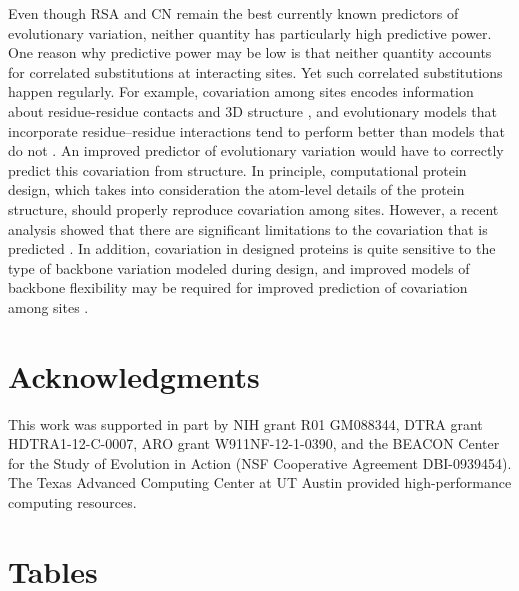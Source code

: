 \documentclass[smallextended]{svjour3}
\begin{document}
Even though RSA and CN remain the best currently known predictors of evolutionary variation, neither quantity has particularly high predictive power. One reason why predictive power may be low is that neither quantity accounts for correlated substitutions at interacting sites.  Yet such correlated substitutions happen regularly. For example, covariation among sites encodes information about residue-residue contacts and 3D structure \citep{Halabietal2009,BurgervanNimwegen2010,Marksetal2011,Jonesetal2014}, and evolutionary models that incorporate residue--residue interactions tend to perform better than models that do not \citep{Rodrigueetal2005,BordnerMittelmann2014}. An improved predictor of evolutionary variation would have to correctly predict this covariation from structure. In principle, computational protein design, which takes into consideration the atom-level details of the protein structure, should properly reproduce covariation among sites. However, a recent analysis showed that there are significant limitations to the covariation that is predicted \citep{OllikainenKortemme2013}. In addition, covariation in designed proteins is quite sensitive to the type of backbone variation modeled during design, and improved models of backbone flexibility may be required for improved prediction of covariation among sites \citep{OllikainenKortemme2013}.

\section*{Acknowledgments}

This work was supported in part by NIH grant R01 GM088344, DTRA grant HDTRA1-12-C-0007, ARO grant W911NF-12-1-0390, and the BEACON Center for the Study of Evolution in Action (NSF Cooperative Agreement DBI-0939454). The Texas Advanced Computing Center at UT Austin provided high-performance computing resources.


\newpage

\section*{Tables}
\end{document}
